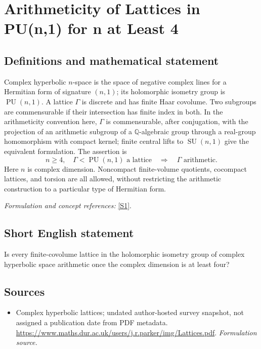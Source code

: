 \documentclass[11pt]{article}
\begin{document}
\section*{\texorpdfstring{Arithmeticity of Lattices in PU(n,1) for n at Least 4}{Arithmeticity of Lattices in PU(n,1) for n at Least 4}}\label{30006877}
\subsection{Definitions and mathematical statement}
Complex hyperbolic $n$-space is the space of negative complex lines for a Hermitian form of signature $(n,1)$; its holomorphic isometry group is $\operatorname{PU}(n,1)$. A lattice $\Gamma$ is discrete and has finite Haar covolume. Two subgroups are commensurable if their intersection has finite index in both. In the arithmeticity convention here, $\Gamma$ is commensurable, after conjugation, with the projection of an arithmetic subgroup of a ${\mathbb{Q}}$-algebraic group through a real-group homomorphism with compact kernel; finite central lifts to $\operatorname{SU}(n,1)$ give the equivalent formulation. The assertion is
\[
 n\ge4,\quad\Gamma<\operatorname{PU}(n,1)\text{ a lattice}
 \quad\Longrightarrow\quad\Gamma\text{ arithmetic}.
\]
Here $n$ is complex dimension. Noncompact finite-volume quotients, cocompact lattices, and torsion are all allowed, without restricting the arithmetic construction to a particular type of Hermitian form.
\par\smallskip\textit{Formulation and concept references:} \href{https://www.maths.dur.ac.uk/users/j.r.parker/img/Lattices.pdf}{[S1]}.

\subsection{Short English statement}
Is every finite-covolume lattice in the holomorphic isometry group of complex hyperbolic space arithmetic once the complex dimension is at least four?
\subsection{Sources}
\begin{itemize}
\item[S1]Complex hyperbolic lattices; undated author-hosted survey snapshot, not assigned a publication date from PDF metadata.
\url{https://www.maths.dur.ac.uk/users/j.r.parker/img/Lattices.pdf}.
\textit{Formulation source.}
\end{itemize}
\end{document}
